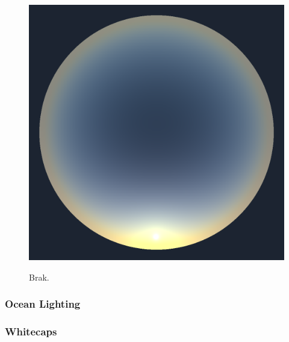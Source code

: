 \begin{figure}
{ \includegraphics[scale=0.125]{figures/preetham_solar_disk_irradiance_3.png}
 }
\caption{Brak.}
\label{fig:preetham}
\end{figure}
%
\cite{Preetham:1999}
\subsubsection{Ocean Lighting}
\cite{article:oceanlighting}
\subsubsection{Whitecaps}
\cite{article:whitecaps}
